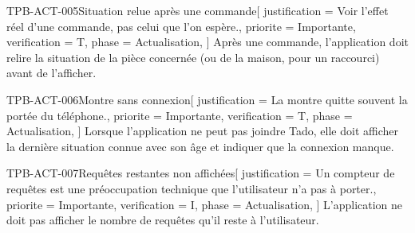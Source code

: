 \begin{exigence}{TPB-ACT-005}{Situation relue après une commande}[
    justification = {Voir l'effet réel d'une commande, pas celui que l'on espère.},
    priorite      = {Importante},
    verification  = {T},
    phase         = {Actualisation},
  ]
  Après une commande, l'application doit relire la situation de la pièce concernée
  (ou de la maison, pour un raccourci) avant de l'afficher.
\end{exigence}

\begin{exigence}{TPB-ACT-006}{Montre sans connexion}[
    justification = {La montre quitte souvent la portée du téléphone.},
    priorite      = {Importante},
    verification  = {T},
    phase         = {Actualisation},
  ]
  Lorsque l'application ne peut pas joindre Tado, elle doit afficher la dernière situation
  connue avec son âge et indiquer que la connexion manque.
\end{exigence}

\begin{exigence}{TPB-ACT-007}{Requêtes restantes non affichées}[
    justification = {Un compteur de requêtes est une préoccupation technique que
                     l'utilisateur n'a pas à porter.},
    priorite      = {Importante},
    verification  = {I},
    phase         = {Actualisation},
  ]
  L'application ne doit pas afficher le nombre de requêtes qu'il reste à l'utilisateur.
\end{exigence}
